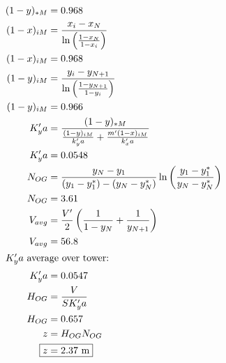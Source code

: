 \documentclass[12pt]{article}
\begin{document}
\begin{enumerate}
\begin{enumerate}
\begin{align*}
            (1 - y)_{*M} &= 0.968 \\
            (1 - x)_{iM} &= \frac{x_i - x_N}{\ln\left(\frac{1-x_N}{1-x_i}\right)} \\
            (1 - x)_{iM} &= 0.968 \\
            (1 - y)_{iM} &= \frac{y_i - y_{N+1}}{\ln\left(\frac{1-y_{N+1}}{1-y_i}\right)} \\
            (1 - y)_{iM} &= 0.966 \\
            K_y'a &= \frac{(1 - y)_{*M}}{\frac{(1 - y)_{iM}}{k_y'a}+\frac{m'(1 - x)_{iM}}{k_x'a}} \\
            K_y'a &= 0.0548 \\
            N_{OG} &= \frac{y_N - y_1}{(y_1-y_1^*) - (y_N-y_N^*)} \ln\left(\frac{y_1-y_1^*}{y_N-y_N^*}\right) \\
            N_{OG} &= 3.61 \\
            V_{avg} &= \frac{V'}{2} \left(\frac{1}{1-y_N}+\frac{1}{y_{N+1}}\right) \\
            V_{avg} &= 56.8 \\
            \intertext{$K_y'a$ average over tower:}
            K_y'a &= 0.0547 \\
            H_{OG} &= \frac{V}{S K_y'a} \\
            H_{OG} &= 0.657 \\
            z &= H_{OG} N_{OG} \\
            \Aboxed{z &= 2.37 \text{ m}}
        \end{align*}
    \end{enumerate}


\end{enumerate}
\end{document}
